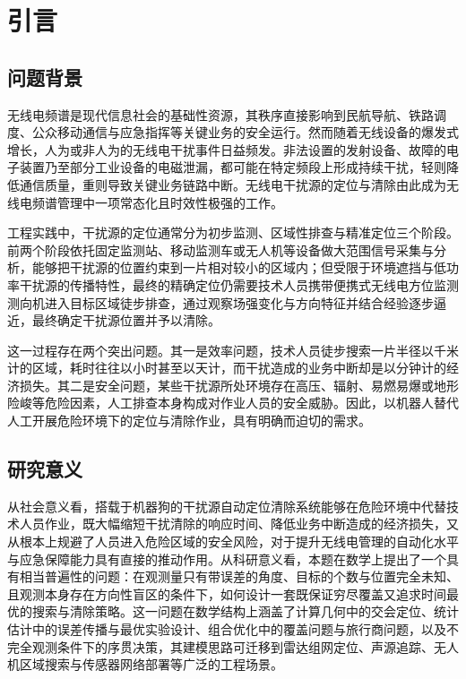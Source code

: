
\section{引言}
\subsection{问题背景}

无线电频谱是现代信息社会的基础性资源，其秩序直接影响到民航导航、铁路调度、公众移动通信与应急指挥等关键业务的安全运行。然而随着无线设备的爆发式增长，人为或非人为的无线电干扰事件日益频发。非法设置的发射设备、故障的电子装置乃至部分工业设备的电磁泄漏，都可能在特定频段上形成持续干扰，轻则降低通信质量，重则导致关键业务链路中断。无线电干扰源的定位与清除由此成为无线电频谱管理中一项常态化且时效性极强的工作。

工程实践中，干扰源的定位通常分为初步监测、区域性排查与精准定位三个阶段。前两个阶段依托固定监测站、移动监测车或无人机等设备做大范围信号采集与分析，能够把干扰源的位置约束到一片相对较小的区域内；但受限于环境遮挡与低功率干扰源的传播特性，最终的精确定位仍需要技术人员携带便携式无线电方位监测测向机进入目标区域徒步排查，通过观察场强变化与方向特征并结合经验逐步逼近，最终确定干扰源位置并予以清除。

这一过程存在两个突出问题。其一是效率问题，技术人员徒步搜索一片半径以千米计的区域，耗时往往以小时甚至以天计，而干扰造成的业务中断却是以分钟计的经济损失。其二是安全问题，某些干扰源所处环境存在高压、辐射、易燃易爆或地形险峻等危险因素，人工排查本身构成对作业人员的安全威胁。因此，以机器人替代人工开展危险环境下的定位与清除作业，具有明确而迫切的需求。

\subsection{研究意义}

从社会意义看，搭载于机器狗的干扰源自动定位清除系统能够在危险环境中代替技术人员作业，既大幅缩短干扰清除的响应时间、降低业务中断造成的经济损失，又从根本上规避了人员进入危险区域的安全风险，对于提升无线电管理的自动化水平与应急保障能力具有直接的推动作用。从科研意义看，本题在数学上提出了一个具有相当普遍性的问题：在观测量只有带误差的角度、目标的个数与位置完全未知、且观测本身存在方向性盲区的条件下，如何设计一套既保证穷尽覆盖又追求时间最优的搜索与清除策略。这一问题在数学结构上涵盖了计算几何中的交会定位、统计估计中的误差传播与最优实验设计、组合优化中的覆盖问题与旅行商问题，以及不完全观测条件下的序贯决策，其建模思路可迁移到雷达组网定位、声源追踪、无人机区域搜索与传感器网络部署等广泛的工程场景。

